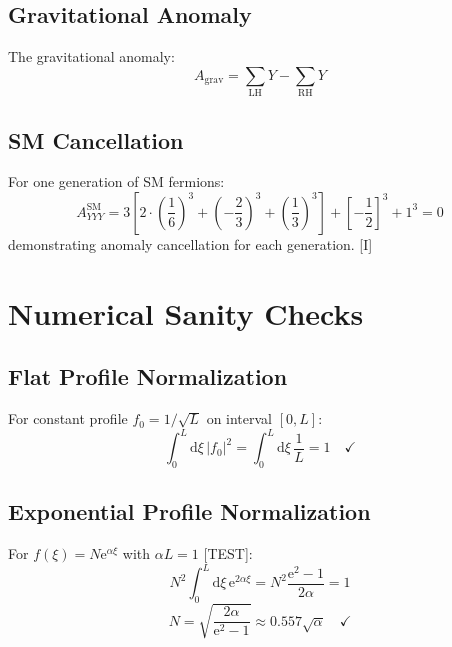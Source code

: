 \documentclass[11pt,a4paper]{article}
\newcommand{\dd}{\mathrm{d}}
\newcommand{\ee}{\mathrm{e}}
\begin{document}
\subsection{Gravitational Anomaly}

The gravitational anomaly:
\begin{equation}
A_{\text{grav}} = \sum_{\text{LH}} Y - \sum_{\text{RH}} Y
\label{eq:grav-anomaly}
\end{equation}

\subsection{SM Cancellation}

For one generation of SM fermions:
\begin{equation}
A_{YYY}^{\text{SM}} = 3\left[2\cdot\left(\frac{1}{6}\right)^3 + \left(-\frac{2}{3}\right)^3 + \left(\frac{1}{3}\right)^3\right] + \left[-\frac{1}{2}\right]^3 + 1^3 = 0
\label{eq:sm-anomaly-cancel}
\end{equation}
demonstrating anomaly cancellation for each generation. [I]

\section{Numerical Sanity Checks}
\label{app:sanity}

\subsection{Flat Profile Normalization}

For constant profile $f_0 = 1/\sqrt{L}$ on interval $[0,L]$:
\begin{equation}
\int_0^L \dd\xi\, |f_0|^2 = \int_0^L \dd\xi\, \frac{1}{L} = 1 \quad \checkmark
\label{eq:flat-check}
\end{equation}

\subsection{Exponential Profile Normalization}

For $f(\xi) = N\ee^{\alpha\xi}$ with $\alpha L = 1$ [TEST]:
\begin{equation}
N^2 \int_0^L \dd\xi\, \ee^{2\alpha\xi} = N^2 \frac{\ee^{2} - 1}{2\alpha} = 1
\label{eq:exp-norm-check}
\end{equation}
\begin{equation}
N = \sqrt{\frac{2\alpha}{\ee^2 - 1}} \approx 0.557 \sqrt{\alpha} \quad \checkmark
\label{eq:exp-norm-value}
\end{equation}
\end{document}
